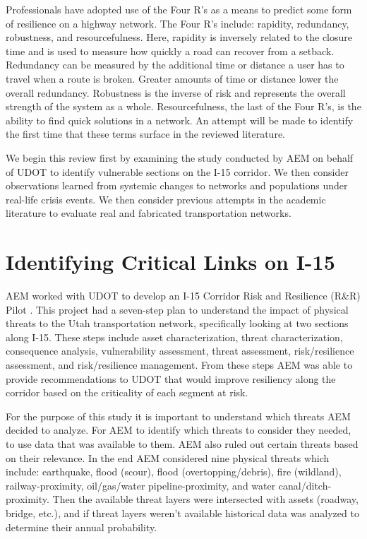 Professionals have adopted use of the Four R’s as a means to predict some
form of resilience on a
highway network. The Four R’s include: rapidity, redundancy, robustness,
and resourcefulness.
Here, rapidity is inversely related to the closure time and is used to
measure how quickly a road
can recover from a setback. Redundancy can be measured by the additional
time or distance a user
has to travel when a route is broken. Greater amounts of time or distance
lower the overall
redundancy. Robustness is the inverse of risk and represents the overall
strength of the system
as a whole. Resourcefulness, the last of the Four R’s, is the ability to
find quick solutions in
a network. An attempt will be made to identify the first time that these
terms surface in the
reviewed literature.

We begin this review first by examining the study conducted by AEM on
behalf of UDOT to identify
vulnerable sections on the I-15 corridor. We then consider observations
learned from systemic
changes to networks and populations under real-life crisis events. We then
consider previous
attempts in the academic literature to evaluate real and fabricated
transportation networks.

\section{Identifying Critical Links on I-15}

AEM worked with UDOT to develop an I-15 Corridor Risk and Resilience
(R\&R) Pilot \cite{aem2017}.
This
project had a seven-step plan to understand the impact of physical threats
to the Utah
transportation network, specifically looking at two sections along I-15.
These steps include
asset characterization, threat characterization, consequence analysis,
vulnerability assessment,
threat assessment, risk/resilience assessment, and risk/resilience
management. From these steps
AEM was able to provide recommendations to UDOT that would improve
resiliency along the corridor
based on the criticality of each segment at risk.

For the purpose of this study it is important to understand which threats
AEM decided to analyze.
For AEM to identify which threats to consider they needed, to use data
that was available to
them. AEM also ruled out certain threats based on their relevance. In the
end AEM considered nine
physical threats which include: earthquake, flood (scour), flood
(overtopping/debris), fire
(wildland), railway-proximity, oil/gas/water pipeline-proximity, and water
canal/ditch-proximity.
Then the available threat layers were intersected with assets (roadway,
bridge, etc.), and if
threat layers weren’t available historical data was analyzed to determine
their annual
probability.

